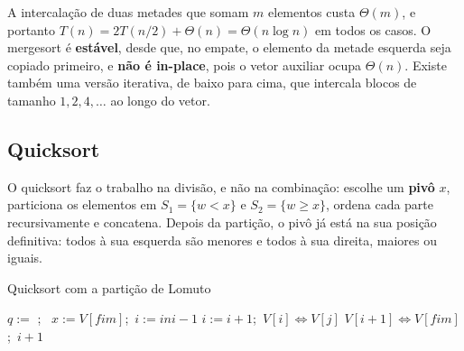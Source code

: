 A intercalação de duas metades que somam $m$ elementos custa $\Theta(m)$, e portanto $T(n)=2T(n/2)+\Theta(n)=\Theta(n\log n)$ em todos os casos. O mergesort é \textbf{estável}, desde que, no empate, o elemento da metade esquerda seja copiado primeiro, e \textbf{não é in-place}, pois o vetor auxiliar ocupa $\Theta(n)$. Existe também uma versão iterativa, de baixo para cima, que intercala blocos de tamanho $1,2,4,\dots$ ao longo do vetor.

\subsection*{Quicksort}
O quicksort faz o trabalho na divisão, e não na combinação: escolhe um \textbf{pivô} $x$, particiona os elementos em $S_1=\{w<x\}$ e $S_2=\{w\ge x\}$, ordena cada parte recursivamente e concatena. Depois da partição, o pivô já está na sua posição definitiva: todos à sua esquerda são menores e todos à sua direita, maiores ou iguais.
\begin{pseudo}{Quicksort com a partição de Lomuto}
\begin{algorithmic}
    \State $q:=$ 
    \State {};\ 
  \EndIf
\EndProcedure
{}
  \State $x:=V[fim]$;\ $i:=ini-1$ 
     \State $i:=i+1$;\ $V[i]\Leftrightarrow V[j]$ \EndIf
  \EndFor
  \State $V[i+1]\Leftrightarrow V[fim]$;\ \Return $i+1$
\EndFunction
\end{algorithmic}
\end{pseudo}

